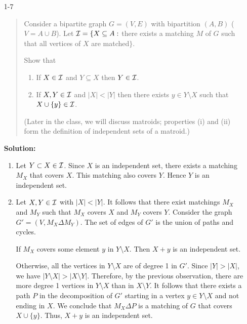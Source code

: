 \documentclass[12pt]{article}
\begin{document}
\begin{enumerate}

\item[1-7] %
\begin{quote}
Consider a bipartite graph $G=(V,E)$ with bipartition $(A,B)$
($V=A\cup B$). Let ${\cal I}=\{X\subseteq A:$ there exists a matching
$M$ of $G$ such that all vertices of $X$ are matched$\}$.

Show that
\begin{enumerate}
\item
If $X\in {\cal I}$ and $Y\subseteq X$ then $Y\in {\cal I}$.
\item
If $X, Y\in {\cal I}$ and $|X|<|Y|$ then there exists $y\in Y\setminus
X$ such that $X\cup\{y\}\in {\cal I}$.
\end{enumerate}
(Later in the class, we will discuss matroids; properties (i) and
(ii) form the definition of independent sets of a matroid.)
\end{quote}
\textbf{Solution: }
\begin{enumerate}
\item Let $Y \subset X \in {\cal I}$. Since $X$ is an
independent set, there exists a matching $M_X$ that covers $X$. This
matching also covers $Y$. Hence $Y$ is an independent set.
\item Let $X,Y \in {\cal I}$ with $|X| < |Y|$. It follows that
there exist matchings $M_X$ and $M_Y$ such that $M_X$ covers $X$ and
$M_Y$ covers $Y$. Consider the graph $G' = (V,M_X \Delta M_Y)$. The
set of edges of $G'$ is the union of paths and cycles.

If $M_X$ covers some element $y$ in $Y\setminus X$. Then $X+ y$ is an
independent set.

Otherwise, all the vertices in $Y\setminus X$ are of degree 1 in
$G'$. Since $|Y| > |X|$, we have $|Y\setminus X| > |X\setminus
Y|$. Therefore, by the previous observation, there are more degree 1
vertices in $Y\setminus X$ than in $X \setminus Y$. It follows that
there exists a path $P$ in the decomposition of $G'$ starting in a
vertex $y \in Y\setminus X$ and not ending in $X$. We conclude that
$M_X \Delta P$ is a matching of $G$ that covers $X \cup \{y\}$. Thus,
$X + y$ is an independent set.
\end{enumerate}



\end{enumerate}
\end{document}
